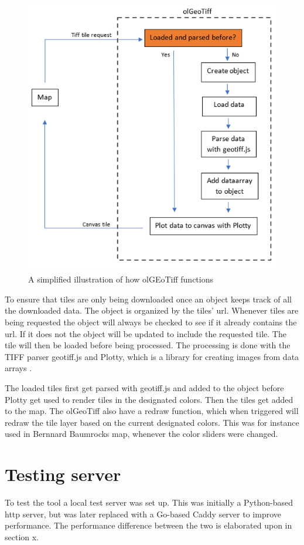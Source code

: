 \begin{figure} [H]
	\centering
	\includegraphics[width=.8\textwidth]{Pictures/olGeoTiffSimplified}
	\caption{A simplified illustration of how olGEoTiff functions}
	\label{olGeoTiffSimplified}
\end{figure}

To ensure that tiles are only being downloaded once an object keeps track of all the downloaded data. The object is organized by the tiles’ url. 
Whenever tiles are being requested the object will always be checked to see if it already contains the url. If it does not the object will be updated to include the requested tile. The tile will then be loaded before being processed. \citep{Baumrocks}
The processing is done with the TIFF parser geotiff.js 
\citep{Geotiff}
and Plotty, which is a library for creating images from data arrays \citep{Plotty}.

The loaded tiles first get parsed with geotiff.js and added to the object before Plotty get used to render tiles in the designated colors. Then the tiles get added to the map.
\citep{Baumrocks}
The olGeoTiff also have a redraw function, which when triggered will redraw the tile layer based on the current designated colors. This was for instance used in Bernnard Baumrocks map, whenever the color sliders were changed. 

\section{Testing server}
To test the tool a local test server was set up. This was initially a Python-based http server, but was later replaced with a Go-based Caddy server to improve performance. The performance difference between the two is elaborated upon in section x.

